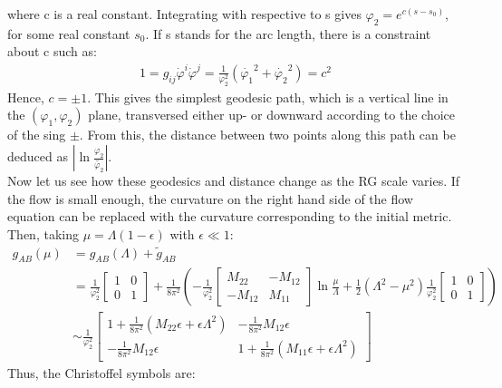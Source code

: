 \documentclass[fleqn]{article}
\begin{document}
where c is a real constant. Integrating with respective to s gives $\varphi _{2} = e^{c(s-s_{0})}$, for some real constant $s_{0}$. If s stands for the arc length, there is a constraint about c such as:
\begin{align}
1= g_{ij} \dot{\varphi}^{i} \dot{\varphi}^{j}  = \frac{1}{\varphi _{2} ^{2}} (\dot{\varphi _{1}} ^{2}+ \dot{\varphi _{2}} ^{2}) = c^{2}
\end{align}
Hence, $c = \pm 1$. This gives the simplest geodesic path, which is a vertical line in the $(\varphi _{1} , \varphi _{2})$ plane, transversed either up- or downward according to the choice of the sing $\pm$. From this, the distance between two points along this path can be deduced as $|\ln \frac{\varphi _{2} } {\tilde{\varphi _{2}}}|$. \\
\indent Now let us see how these geodesics and distance change as the RG scale varies. If the flow is small enough, the curvature on the right hand side of the flow equation can be replaced with the curvature corresponding to the initial metric. Then, taking $\mu = \Lambda (1- \epsilon)$ with $\epsilon \ll 1$:
\begin{align}
g_{AB} (\mu) &= g_{AB} (\Lambda) + \tilde{g}_{AB}  \nonumber  \\
&= \frac{1}{\varphi _{2} ^{2}} \begin{bmatrix}
1 & 0 \\
0 & 1
\end{bmatrix} 
+ \frac{1}{8\pi ^{2}} (-\frac{1}{\varphi _{2}^{2}} \begin{bmatrix}
M_{22}& -M_{12} \\
-M_{12} & M_{11} 
\end{bmatrix} \ln\frac{\mu}{\Lambda} 
+ \frac{1}{2} (\Lambda ^{2} - \mu^2) \frac{1}{\varphi _{2} ^{2}} \begin{bmatrix}
1 & 0 \\
0 & 1 
\end{bmatrix}) \nonumber \\
& \sim \frac{1}{\varphi _{2} ^{2}} \begin{bmatrix}
1 + \frac{1}{8\pi ^{2}}(M_{22}\epsilon + \epsilon \Lambda ^{2}) & -\frac{1}{8\pi ^{2}}M_{12} \epsilon \\
-\frac{1}{8\pi ^{2}} M_{12} \epsilon &  1 + \frac{1}{8\pi ^{2}}(M_{11} \epsilon + \epsilon \Lambda ^{2} )
\end{bmatrix}
\end{align}
Thus, the Christoffel symbols are:
\begin{align}

\end{align}
\end{document}
